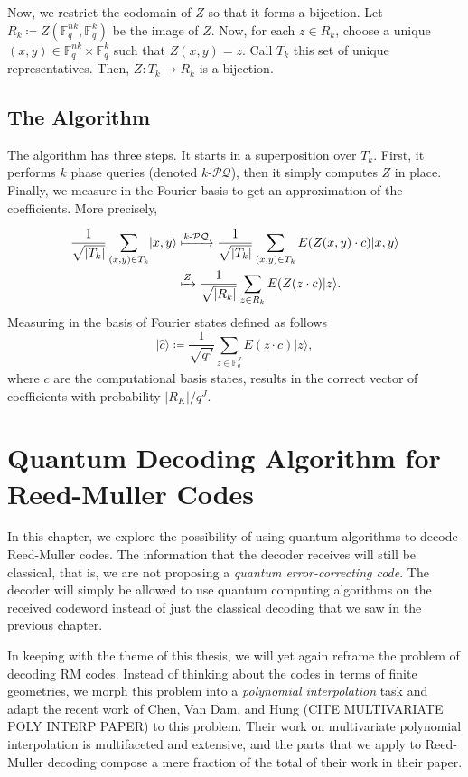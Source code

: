\documentclass[12pt,twoside]{reedthesis}
\theoremstyle{definition}
\newcommand{\F}{\mathbb{F}}
\newcommand{\ket}[1]{\ensuremath{\lvert #1\rangle}\xspace}
\begin{document}
Now, we restrict the codomain of $Z$ so that it forms a bijection. Let $R_k \coloneqq Z(\F_q^{nk}, \F_q^k)$ be the image of $Z$. Now, for each $z \in R_k$, choose a unique $(x,y) \in \F_q^{nk} \times \F_q^{k}$ such that $Z(x,y) = z$. Call $T_k$ this set of unique representatives. Then, $Z: T_k \rightarrow R_k$ is a bijection.

\section{The Algorithm}
The algorithm has three steps. It starts in a superposition over $T_k$. First, it performs $k$ phase queries (denoted $k$-$\mathcal{PQ}$), then it simply computes $Z$ in place. Finally, we measure in the Fourier basis to get an approximation of the coefficients. More precisely,

\begin{align*}
\frac{1}{\sqrt{\lvert T_k \rvert}} \sum_{(x,y)\in T_k} \ket{x,y} 
& \xmapsto{k\text{-}\mathcal{PQ}} \frac{1}{\sqrt{\lvert T_k \rvert}} \sum_{(x,y)\in T_k} E(Z(x,y) \cdot c) \ket{x,y} \\
& \xmapsto{Z} \frac{1}{\sqrt{\lvert R_k \rvert}} \sum_{z\in R_k} E(Z(z \cdot c) \ket{z}. 
\end{align*}
Measuring in the basis of Fourier states defined as follows
\begin{equation*}
\ket{\hat{c}} \coloneqq \frac{1}{\sqrt{q^J}} \sum_{z \in \F_q^J} E(z \cdot c) \ket{z},
\end{equation*}
where $c$ are the computational basis states, results in the correct vector of coefficients with probability $\lvert R_K \rvert / q^J$.


\chapter{Quantum Decoding Algorithm for Reed-Muller Codes}
In this chapter, we explore the possibility of using quantum algorithms to decode Reed-Muller codes. The information that the decoder receives will still be classical, that is, we are not proposing a \textit{quantum error-correcting code}. The decoder will simply be allowed to use quantum computing algorithms on the received codeword instead of just the classical decoding that we saw in the previous chapter.

In keeping with the theme of this thesis, we will yet again reframe the problem of decoding RM codes. Instead of thinking about the codes in terms of finite geometries, we morph this problem into a \textit{polynomial interpolation} task and adapt the recent work of Chen, Van Dam, and Hung (CITE MULTIVARIATE POLY INTERP PAPER) to this problem. Their work on multivariate polynomial interpolation is multifaceted and extensive, and the parts that we apply to Reed-Muller decoding compose a mere fraction of the total of their work in their paper. 
\end{document}
